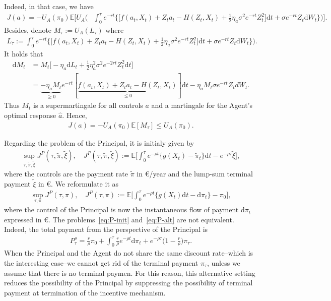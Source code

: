 \documentclass[a4paper,10pt]{article}
\newcommand{\E}{\mathbb{E}}
\newcommand{\dd}{\mathrm{d}}
\theoremstyle{definition}
\theoremstyle{plain}
\numberwithin{equation}{section}
\newcommand{\hs}{\vspace{3mm}}
\begin{document}
Indeed, in that case, we have
\begin{align*}
 J(a) = -U_A(\pi_0)\E\Big[U_A\Big(& \int_0^\tau  e^{-r t} \Big\{ \Big[ f(a_t,X_t) + Z_t a_t - H(Z_t,X_t)   
+  \frac12 \eta_a\sigma^2 e^{-r t} Z_t^2\Big]   \dd t + \sigma e^{-r t} Z_t \dd W_t \Big\} \Big) \Big].
\end{align*}
Besides, denote $M_\tau := U_A(L_\tau)$ where
\begin{align*}
L_\tau :=  \int_0^\tau  e^{-r t} \Big\{ \Big[ f(a_t,X_t) + Z_t a_t - H(Z_t,X_t)   
+  \frac12 \eta_a\sigma^2 e^{-r t} Z_t^2\Big]   \dd t + \sigma e^{- r t} Z_t \dd W_t \Big\} \Big).
\end{align*}
It holds that
\begin{align*}
\dd M_t & = M_t\big[ -\eta_a \dd L_t + \frac12 \eta_a^2 \sigma^2 e^{-2 r t} Z_t^2 \dd t\big] \\
& =  \underbrace{-\eta_a   M_t}_{\geq 0} e^{- r t} [ \underbrace{f(a_t,X_t) + Z_t a_t - H(Z_t,X_t)}_{\leq 0}]  \dd t   -\eta_a  M_t \sigma e^{- r t} Z_t dW_t.
\end{align*}
Thus $M_t$ is a supermartingale for all controls $a$ and a martingale for the Agent's optimal response $\hat a$. Hence,
\begin{align*}
 J(a) = - U_A(\pi_0) \E[M_\tau] \leq U_A(\pi_0).
\end{align*}

\hs

Regarding the problem of the Principal, it is initialy given by
\begin{align}\label{eq:P-init}
\sup_{\tau,\tilde\pi,\tilde\xi} J^{P}(\tau,\tilde\pi,\tilde\xi), \quad 
J^{P}(\tau,\tilde\pi,\tilde\xi) := 
\E\Big[ \int_0^\tau e^{-\rho t} \big\{g(X_t) -\tilde\pi_t\big\} \dd t -  e^{-\rho \tau} \tilde\xi \Big],
\end{align}
where the controls are the payment rate $\tilde\pi$ in \euro/year and the lump-sum terminal payment $\tilde\xi$ in \euro. We reformulate it as
\begin{align}\label{eq:P-alt}
\sup_{\tau,\pi} J^{P}(\tau,\pi), \quad 
J^{P}(\tau,\pi) := 
\E\Big[ \int_0^\tau e^{-\rho t} \big\{g(X_t) \dd t -\dd \pi_t\big\} - \pi_0 \Big],
\end{align}
where the control of the Principal is now the instantaneous flow of payment $\dd \pi_t$ expressed in \euro. 
The problems~\eqref{eq:P-init} and~\eqref{eq:P-alt} are not equivalent. Indeed, the total payment from the perspective of the Principal is
\begin{align*}
P^\rho_\tau =  \frac{r}{\rho} \pi_0 + \int_0^\tau \frac{r}{\rho} e^{- \rho t} \dd \pi_t  + e^{-\rho \tau} \Big(1 - \frac{r}{\rho} \Big) \pi_\tau.
\end{align*}
When the Principal and the Agent do not share the same discount rate--which is the interesting case--we cannot get rid of the terminal payment $\pi_\tau$, unless we assume that there is no terminal paymen. For this reason, this alternative setting reduces the possibility of the Principal by suppressing the possibility of terminal payment at termination of the incentive mechanism.
\end{document}

